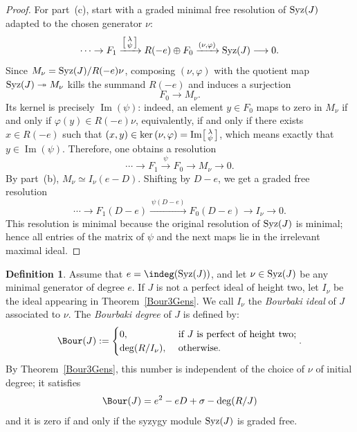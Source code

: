 \documentclass[11pt]{amsart} %
\newcommand{\lar}{\longrightarrow}
\theoremstyle{definition}
\newtheorem{Definition}[Theorem]{Definition}
\def\ker{{\rm ker}\,}
\def\syz{\mbox{\rm Syz}}
\begin{document}
\begin{proof}
For part~(c), start with a graded minimal free resolution of $\syz(J)$
adapted to the chosen generator $\nu$:
\[
\cdots \to F_1
\xrightarrow{\left[\begin{smallmatrix}\lambda\\ \psi\end{smallmatrix}\right]}
R(-e)\oplus F_0
\xrightarrow{(\nu,\varphi)}
\syz(J)
\lar 0.
\]
Since $M_\nu=\syz(J)/R(-e)\nu$, composing $(\nu,\varphi)$ with the quotient map
$\syz(J)\twoheadrightarrow M_\nu$ kills the summand $R(-e)$ and induces a surjection
\[
F_0 \lar M_\nu.
\]
Its kernel is precisely $\operatorname{Im}(\psi)$: indeed, an element
$y\in F_0$ maps to zero in $M_\nu$ if and only if $\varphi(y)\in R(-e)\nu$,
equivalently, if and only if there exists $x\in R(-e)$ such that
$(x,y)\in \ker(\nu,\varphi)=\operatorname{Im}\!\left[\begin{smallmatrix}\lambda\\ \psi\end{smallmatrix}\right]$,
which means exactly that $y\in \operatorname{Im}(\psi)$. Therefore, one obtains a resolution
\[
\cdots \to F_1
\xrightarrow{\ \psi\ }
F_0
\lar M_\nu
\lar 0.
\]
By part~(b), $M_\nu\simeq I_\nu(e-D)$. Shifting by $D-e$, we get a graded free resolution
\[
\cdots \to F_1(D-e)
\xrightarrow{\ \psi(D-e)\ }
F_0(D-e)
\lar I_\nu
\lar 0.
\]
This resolution is minimal because the original resolution of $\syz(J)$ is minimal;
hence all entries of the matrix of $\psi$ and the next maps lie in the irrelevant maximal ideal.
\end{proof}


\begin{Definition}\label{defi:Bourbaki-degree-non-equigen}
Assume that $e=\indeg(\syz(J))$, and let $\nu\in \syz(J)$ be any minimal generator of
degree $e$. If $J$ is not a perfect ideal of height two, let $I_\nu$ be the ideal appearing in 
Theorem~\ref{Bour3Gens}. We call $I_\nu$ the \emph{Bourbaki ideal} of $J$ associated to $\nu$. The \emph{Bourbaki degree} of $J$ is defined by:
$$
\Bour(J):= \begin{cases}
0,             &\text{ if }J\text{ is perfect of height two;}\\
\deg(R/I_\nu), &\text{ otherwise.}\\
\end{cases} .
$$
By Theorem~\ref{Bour3Gens}, this number is independent of the choice
of $\nu$ of initial degree; it satisfies
\begin{equation}\label{eq:Bourbaki-formula-non-equigen}
\Bour(J)=e^2-eD+\sigma-\deg(R/J)    
\end{equation}
and it is zero if and only if the syzygy module $\syz(J)$ is graded free.
\end{Definition}
\end{document}
